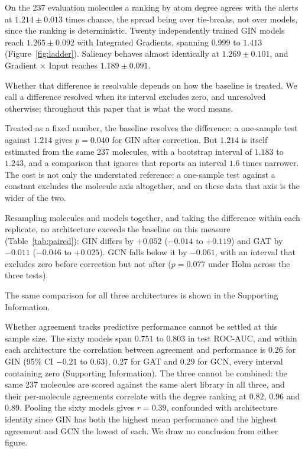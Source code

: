 \documentclass[journal=jcisd8,manuscript=article]{achemso}
\begin{document}
On the 237 evaluation molecules a ranking by atom degree agrees with the alerts at
$1.214 \pm 0.013$ times chance, the spread being over tie-breaks, not over models,
since the ranking is deterministic. Twenty independently trained GIN models reach
$1.265 \pm 0.092$ with Integrated Gradients, spanning $0.999$ to $1.413$
(Figure~\ref{fig:ladder}). Saliency behaves almost identically at
$1.269 \pm 0.101$, and Gradient $\times$ Input reaches $1.189 \pm 0.091$.

Whether that difference is resolvable depends on how the baseline is treated. We call a
difference resolved when its interval excludes zero, and unresolved otherwise; throughout this
paper that is what the word means.

Treated as a fixed number, the baseline resolves the difference: a one-sample test against
$1.214$ gives $p = 0.040$ for GIN after correction. But $1.214$ is itself estimated from the
same 237 molecules, with a bootstrap interval of $1.183$ to $1.243$, and a comparison that
ignores that reports an interval $1.6$ times narrower. The cost is not only the understated
reference: a one-sample test against a constant excludes the molecule axis altogether, and on
these data that axis is the wider of the two.

Resampling molecules and models together, and taking the difference within each replicate, no
architecture exceeds the baseline on this measure (Table~\ref{tab:paired}): GIN differs by
$+0.052$ ($-0.014$ to $+0.119$) and GAT by $-0.011$ ($-0.046$ to $+0.025$). GCN falls below
it by $-0.061$, with an interval that excludes zero before correction but not after
($p = 0.077$ under Holm across the three tests).



The same comparison for all three architectures is shown in the Supporting Information.

Whether agreement tracks predictive performance cannot be settled at this sample size. The
sixty models span $0.751$ to $0.803$ in test ROC-AUC, and within each architecture the
correlation between agreement and performance is $0.26$ for GIN (95\% CI $-0.21$ to $0.63$),
$0.27$ for GAT and $0.29$ for GCN, every interval containing zero
(Supporting Information). The three cannot be combined: the same 237 molecules are scored
against the same alert library in all three, and their per-molecule agreements correlate with
the degree ranking at $0.82$, $0.96$ and $0.89$. Pooling the sixty models gives $r = 0.39$,
confounded with architecture identity since GIN has both the highest mean performance and the
highest agreement and GCN the lowest of each. We draw no conclusion from either figure.
\end{document}
